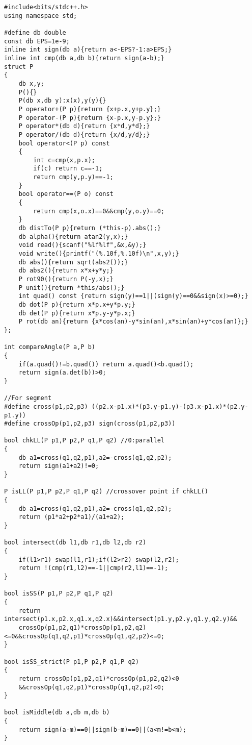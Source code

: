 \begin{lstlisting}
#include<bits/stdc++.h>
using namespace std;

#define db double
const db EPS=1e-9;
inline int sign(db a){return a<-EPS?-1:a>EPS;}
inline int cmp(db a,db b){return sign(a-b);}
struct P
{
    db x,y;
    P(){}
    P(db x,db y):x(x),y(y){}
    P operator+(P p){return {x+p.x,y+p.y};}
    P operator-(P p){return {x-p.x,y-p.y};}
    P operator*(db d){return {x*d,y*d};}
    P operator/(db d){return {x/d,y/d};}
    bool operator<(P p) const
    {
        int c=cmp(x,p.x);
        if(c) return c==-1;
        return cmp(y,p.y)==-1;
    }
    bool operator==(P o) const
    {
        return cmp(x,o.x)==0&&cmp(y,o.y)==0;
    }
    db distTo(P p){return (*this-p).abs();}
    db alpha(){return atan2(y,x);}
    void read(){scanf("%lf%lf",&x,&y);}
    void write(){printf("(%.10f,%.10f)\n",x,y);}
    db abs(){return sqrt(abs2());}
    db abs2(){return x*x+y*y;}
    P rot90(){return P(-y,x);}
    P unit(){return *this/abs();}
    int quad() const {return sign(y)==1||(sign(y)==0&&sign(x)>=0);}
    db dot(P p){return x*p.x+y*p.y;}
    db det(P p){return x*p.y-y*p.x;}
    P rot(db an){return {x*cos(an)-y*sin(an),x*sin(an)+y*cos(an)};}
};

int compareAngle(P a,P b)
{
    if(a.quad()!=b.quad()) return a.quad()<b.quad();
    return sign(a.det(b))>0;
}

//For segment
#define cross(p1,p2,p3) ((p2.x-p1.x)*(p3.y-p1.y)-(p3.x-p1.x)*(p2.y-p1.y))
#define crossOp(p1,p2,p3) sign(cross(p1,p2,p3))

bool chkLL(P p1,P p2,P q1,P q2) //0:parallel
{
    db a1=cross(q1,q2,p1),a2=-cross(q1,q2,p2);
    return sign(a1+a2)!=0;
}

P isLL(P p1,P p2,P q1,P q2) //crossover point if chkLL()
{
    db a1=cross(q1,q2,p1),a2=-cross(q1,q2,p2);
    return (p1*a2+p2*a1)/(a1+a2);
}

bool intersect(db l1,db r1,db l2,db r2)
{
    if(l1>r1) swap(l1,r1);if(l2>r2) swap(l2,r2);
    return !(cmp(r1,l2)==-1||cmp(r2,l1)==-1);
}

bool isSS(P p1,P p2,P q1,P q2)
{
    return intersect(p1.x,p2.x,q1.x,q2.x)&&intersect(p1.y,p2.y,q1.y,q2.y)&&
    crossOp(p1,p2,q1)*crossOp(p1,p2,q2)<=0&&crossOp(q1,q2,p1)*crossOp(q1,q2,p2)<=0;
}

bool isSS_strict(P p1,P p2,P q1,P q2)
{
    return crossOp(p1,p2,q1)*crossOp(p1,p2,q2)<0
    &&crossOp(q1,q2,p1)*crossOp(q1,q2,p2)<0;
}

bool isMiddle(db a,db m,db b)
{
    return sign(a-m)==0||sign(b-m)==0||(a<m!=b<m);
}


\end{lstlisting}
